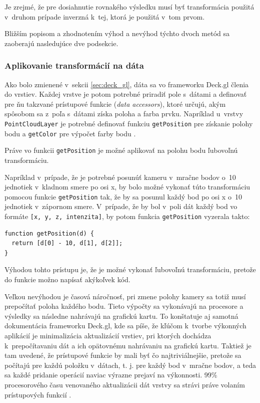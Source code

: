 Je zrejmé, že pre dosiahnutie rovnakého výsledku musí byť transformácia použitá v~druhom prípade inverzná k~tej, ktorá je použitá v~tom prvom.

Bližším popisom a zhodnotením výhod a nevýhod týchto dvoch metód sa zaoberajú nasledujúce dve podsekcie.

\subsubsection{Aplikovanie transformácií na dáta}

Ako bolo zmienené v~sekcii \ref{sec:deck_gl}, dáta sa vo frameworku Deck.gl členia do vrstiev. Každej vrstve je potom potrebné priradiť pole s~dátami a definovať pre ňu takzvané prístupové funkcie (\emph{data accessors}), ktoré určujú, akým spôsobom sa z~poľa s~dátami získa poloha a farba prvku. Napríklad u~vrstvy \texttt{PointCloudLayer} je potrebné definovať funkciu \texttt{getPosition} pre získanie polohy bodu a \texttt{getColor} pre výpočet farby bodu \cite{deck.gl_documentation}.

Práve vo funkcii \texttt{getPosition} je možné aplikovať na polohu bodu ľubovoľnú transformáciu.

Napríklad v~prípade, že je potrebné posunúť kameru v~mračne bodov o~10 jednotiek v~kladnom smere po osi x, by bolo možné vykonať túto transformáciu pomocou funkcie \texttt{getPosition} tak, že by sa posunul každý bod po osi x o~10 jednotiek v~zápornom smere. V~prípade, že by bol v~poli dát každý bod vo formáte \texttt{[x, y, z, intenzita]}, by potom funkcia \texttt{getPosition} vyzerala takto:

\begin{lstlisting}
function getPosition(d) {
  return [d[0] - 10, d[1], d[2]];
}
\end{lstlisting}

Výhodou tohto prístupu je, že je možné vykonať ľubovoľnú transformáciu, pretože do funkcie možno napísať akýkoľvek kód.

Veľkou nevýhodou je časová náročnosť, pri zmene polohy kamery sa totiž musí prepočítať poloha každého bodu. Tieto výpočty sa vykonávajú na procesore a výsledky sa následne nahrávajú na grafickú kartu. To konštatuje aj samotná dokumentácia frameworku Deck.gl, kde sa píše, že kľúčom k~tvorbe výkonných aplikácií je minimalizácia aktualizácií vrstiev, pri ktorých dochádza k~prepočítavaniu dát a ich opätovnému nahrávaniu na grafickú kartu. Taktiež je tam uvedené, že prístupové funkcie by mali byť čo najtriviálnejšie, pretože sa počítajú pre každú položku v~dátach, t. j. pre každý bod v~mračne bodov, a teda sa každé pridanie operácií naviac výrazne prejaví na výkonnosti. 99\% procesorového času venovaného aktualizácii dát vrstvy sa strávi práve volaním prístupových funkcií \cite{deck.gl_performance_optimization}.

